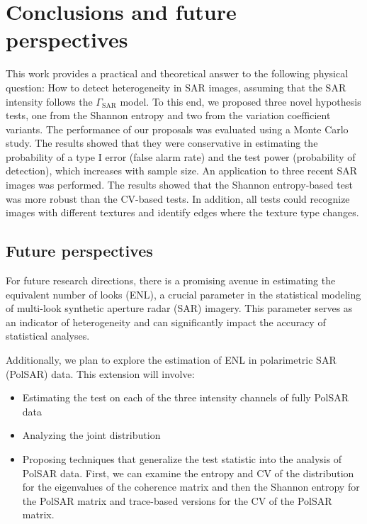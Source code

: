 \chapter{Conclusions and future perspectives}\label{chp:conclusions}

This work provides a practical and theoretical answer to the
following physical question: How to detect heterogeneity in SAR images,
assuming that the SAR intensity follows the \(\Gamma_{\text{SAR}}\)
model. To this end, we proposed three novel hypothesis tests, one from
the Shannon entropy and two from the variation coefficient variants. The
performance of our proposals was evaluated using a Monte Carlo study.
The results showed that they were conservative in estimating the
probability of a type I error (false alarm rate) and the test power
(probability of detection), which increases with sample size. An
application to three recent SAR images was performed. The results showed
that the Shannon entropy-based test was more robust than the CV-based
tests. In addition, all tests could recognize images with different
textures and identify edges where the texture type changes.


\section*{Future perspectives}

For future research directions, there is a promising avenue in estimating the equivalent number of looks (ENL), a crucial parameter in the statistical modeling of multi-look synthetic aperture radar (SAR) imagery. This parameter serves as an indicator of heterogeneity and can significantly impact the accuracy of statistical analyses.

Additionally, we plan to explore the estimation of ENL in polarimetric SAR (PolSAR) data. This extension will involve:
\begin{itemize}
	\item Estimating the test on each of the three intensity channels of fully PolSAR data
	\item Analyzing the joint distribution
	\item Proposing techniques that generalize the test statistic  into the analysis of PolSAR data. 
		First, we can examine the entropy and CV of the distribution for the eigenvalues
		of the coherence matrix and then the Shannon entropy for the PolSAR matrix
			and trace-based versions for the CV of the PolSAR matrix.
\end{itemize}